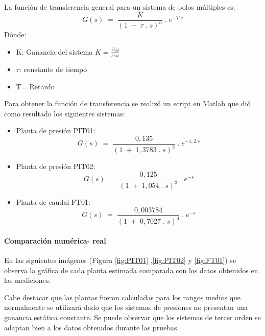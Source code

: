 {La función de transferencia general para un sistema de polos múltiples es:
\begin{equation}
	G(s)\;=\;\frac K{(1\;+\;\tau\;.\;s)^n}\;.\;e^{-T.s}
\end{equation}
Dónde:
\begin{itemize}
	\item K:  Ganancia del sistema $K = \frac{\triangle y}{\triangle u}$
	\item $\tau$: constante de tiempo
	\item T= Retardo
\end{itemize}
Para obtener la función de transferencia se realizó un script en Matlab que dió como resultado los siguientes sistemas:
\begin{itemize}
	\item Planta de presión PIT01:
	\begin{equation}
	 G(s)\;=\;\frac {0,135}{(1\;+\;1,3783\;.\;s)^3}\;.\;e^{-1,2.s}
	\end{equation}
	\item Planta de presión PIT02: 	
	\begin{equation}
		G(s)\;=\;\frac {0,125}{(1\;+\;1,054\;.\;s)^3}\;.\;e^{-s}
	\end{equation}
	\item Planta de caudal FT01:
		\begin{equation}
		G(s)\;=\;\frac {0,003784}{(1\;+\;0,7027\;.\;s)^3}\;.\;e^{-s}
	\end{equation}
\end{itemize}

\paragraph{Comparación numérica- real}
En las siguientes imágenes (Figura \ref{fig:PIT01} ,\ref{fig:PIT02} y \ref{fig:FT01}) se observa la gráfica de cada planta estimada comparada con los datos obtenidos en las mediciones.
\begin{comment}
$C:\Users\glori\Desktop\DANIELA\VISUAL_DANI\Automa\MATLAB\Prueba_PLANTA\Imaagenes Calculo Plantas\FIT001
Strenj_RESPUESTA.png$
\end{comment}

Cabe destacar que las plantas fueron calculadas para los rangos medios que normalmente se utilizará dado que los sistemas de presiones no presentan una ganancia estática constante.
Se puede observar que los sistemas de tercer orden se adaptan bien a los datos obtenidos durante las pruebas.
\begin{comment}
no borrar opr las dudas que quisimos poner esto
 

\end{comment}}
